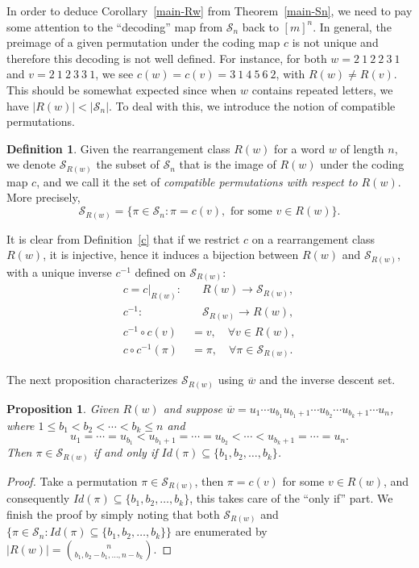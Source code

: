 \documentclass[12pt]{amsart}
\numberwithin{equation}{section}
\theoremstyle{plain}
\newtheorem{proposition}[theorem]{Proposition}
\theoremstyle{definition}
\newtheorem{Def}[theorem]{Definition}
\def\SS{\mathcal{S}}
\begin{document}
In order to deduce Corollary~\ref{main-Rw} from Theorem~\ref{main-Sn}, we need to pay some attention to the ``decoding'' map from $\SS_n$ back to $[m]^n$. In general, the preimage of a given permutation under the coding map $c$ is not unique and therefore this decoding is not well defined. For instance, for both $w=2~1~2~2~3~1$ and $v=2~1~2~3~3~1$, we see $c(w)=c(v)=3~1~4~5~6~2$, with $R(w)\neq R(v)$. This should be somewhat expected since when $w$ contains repeated letters, we have $|R(w)|<|\SS_n|$. To deal with this, we introduce the notion of compatible permutations.



\begin{Def}
Given the rearrangement class $R(w)$ for a word $w$ of length $n$, we denote $\SS_{R(w)}$ the subset of $\SS_n$ that is the image of $R(w)$ under the coding map $c$, and we call it the set of \emph{compatible permutations with respect to $R(w)$}. More precisely,
$$
\SS_{R(w)}=\{\pi\in\SS_n: \pi=c(v), \text{ for some }v\in R(w)\}.
$$
\end{Def}
It is clear from Definition~\ref{c} that if we restrict $c$ on a rearrangement class $R(w)$, it is injective, hence it induces a bijection between $R(w)$ and $\SS_{R(w)}$, with a unique inverse $c^{-1}$ defined on $\SS_{R(w)}$:
\begin{align}
c=c|_{R(w)}:& \quad R(w)\rightarrow \SS_{R(w)},\nonumber\\
c^{-1}:& \quad \SS_{R(w)}\rightarrow R(w),\nonumber\\
\label{dc=1}c^{-1}\circ c(v)&=v, \quad\forall v\in R(w),\\
\label{cd=1}c\circ c^{-1}(\pi)&=\pi, \quad\forall \pi\in \SS_{R(w)}.
\end{align}

The next proposition characterizes $\SS_{R(w)}$ using $\overline{w}$ and the inverse descent set.

\begin{proposition}\label{charSRw}
Given $R(w)$ and suppose $\overline{w}=u_1\cdots u_{b_1}u_{b_1+1}\cdots u_{b_2}\cdots u_{b_k+1}\cdots u_{n}$, where $1\leq b_1<b_2<\cdots<b_k\leq n$ and
$$
u_1=\cdots=u_{b_1}<u_{b_1+1}=\cdots=u_{b_2}<\cdots<u_{b_k+1}=\cdots=u_n.
$$
Then $\pi\in\SS_{R(w)}$ if and only if $Id(\pi)\subseteq \{b_1, b_2,\ldots, b_k\}$.
\end{proposition}
\begin{proof}
Take a permutation $\pi\in\SS_{R(w)}$, then $\pi=c(v)$ for some $v\in R(w)$, and consequently $Id(\pi)\subseteq \{b_1, b_2,\ldots, b_k\}$, this takes care of the ``only if'' part. We finish the proof by simply noting that both $\SS_{R(w)}$ and $\{\pi\in\SS_n:Id(\pi)\subseteq \{b_1, b_2,\ldots, b_k\}\}$ are enumerated by $|R(w)|=\binom{n}{b_1,b_2-b_1,\ldots,n-b_k}$.
\end{proof}
\end{document}
